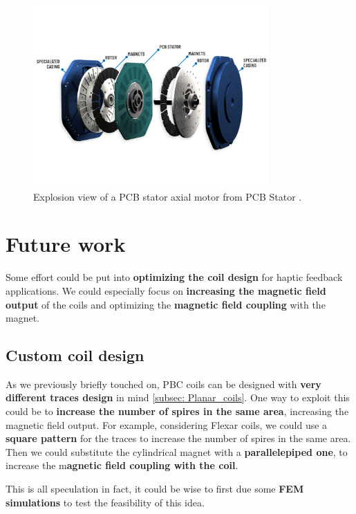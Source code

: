 \begin{figure}[H]
    \centering
    \includegraphics[width=0.8\textwidth]{Chapters/Chapter6/Figures/PCB_stator_motor_expl.png}
    \caption[Explosion view of a PCB stator axial motor from PCB Stator.]{Explosion view of a PCB stator axial motor from PCB Stator \cite{PCBStator}.}
    \label{fig:PCB_motor}
\end{figure}

\section{Future work}
Some effort could be put into \textbf{optimizing the coil design} for haptic feedback applications.
We could especially focus on \textbf{increasing the magnetic field output} of the coils and optimizing the \textbf{magnetic field coupling} with the magnet.

\subsection{Custom coil design}
As we previously briefly touched on, PBC coils can be designed with \textbf{very different traces design} in mind \ref{subsec: Planar_coils}.
One way to exploit this could be to \textbf{increase the number of spires in the same area}, increasing the magnetic field output.
For example, considering Flexar coils, we could use a \textbf{square pattern} for the traces to increase the number of spires in the same area.
Then we could substitute the cylindrical magnet with a \textbf{parallelepiped one}, to increase the m\textbf{agnetic field coupling with the coil}.

This is all speculation in fact, it could be wise to first due some \textbf{FEM simulations} to test the feasibility of this idea.
